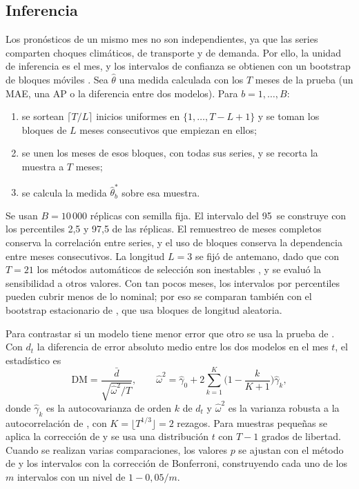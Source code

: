 \subsection{Inferencia}
\label{sec:inferencia}

Los pronósticos de un mismo mes no son independientes, ya que las series comparten choques climáticos, de transporte y de demanda. Por ello, la unidad de inferencia es el mes, y los intervalos de confianza se obtienen con un bootstrap de bloques móviles \citep{kunsch1989,lahiri2003}. Sea $\hat\theta$ una medida calculada con los $T$ meses de la prueba (un MAE, una AP o la diferencia entre dos modelos). Para $b=1,\dots,B$:
\begin{enumerate}[nosep]
\item se sortean $\lceil T/L\rceil$ inicios uniformes en $\{1,\dots,T-L+1\}$ y se toman los bloques de $L$ meses consecutivos que empiezan en ellos;
\item se unen los meses de esos bloques, con todas sus series, y se recorta la muestra a $T$ meses;
\item se calcula la medida $\hat\theta^\ast_b$ sobre esa muestra.
\end{enumerate}
Se usan $B=10\,000$ réplicas con semilla fija. El intervalo del 95\pct\ se construye con los percentiles 2,5 y 97,5 de las réplicas. El remuestreo de meses completos conserva la correlación entre series, y el uso de bloques conserva la dependencia entre meses consecutivos. La longitud $L=3$ se fijó de antemano, dado que con $T=21$ los métodos automáticos de selección son inestables \citep{politis2004}, y se evaluó la sensibilidad a otros valores. Con tan pocos meses, los intervalos por percentiles pueden cubrir menos de lo nominal; por eso se comparan también con el bootstrap estacionario de \citet{politis1994}, que usa bloques de longitud aleatoria.

Para contrastar si un modelo tiene menor error que otro se usa la prueba de \citet{dm1995}. Con $d_t$ la diferencia de error absoluto medio entre los dos modelos en el mes $t$, el estadístico es
\begin{equation}
\mathrm{DM}=\frac{\bar d}{\sqrt{\hat\omega^2/T}},\qquad \hat\omega^2=\hat\gamma_0+2\sum_{k=1}^{K}\Big(1-\frac{k}{K+1}\Big)\hat\gamma_k ,
\end{equation}
donde $\hat\gamma_k$ es la autocovarianza de orden $k$ de $d_t$ y $\hat\omega^2$ es la varianza robusta a la autocorrelación de \citet{newey1987}, con $K=\lfloor T^{1/3}\rfloor=2$ rezagos. Para muestras pequeñas se aplica la corrección de \citet{hln1997} y se usa una distribución $t$ con $T-1$ grados de libertad. Cuando se realizan varias comparaciones, los valores $p$ se ajustan con el método de \citet{holm1979} y los intervalos con la corrección de Bonferroni, construyendo cada uno de los $m$ intervalos con un nivel de $1-0{,}05/m$.

